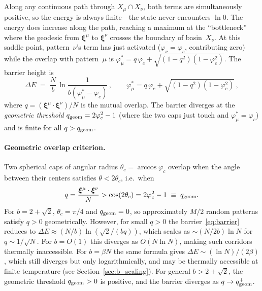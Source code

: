 \documentclass[11pt]{article}
\newcommand{\vp}{\varphi}
\newcommand{\bxi}{\boldsymbol{\xi}}
\begin{document}
Along any continuous path through $X_\mu \cap X_\nu$,
both terms are simultaneously positive, so the energy
is always finite---the state never encounters $\ln 0$.
The energy does increase along the path, reaching a maximum
at the ``bottleneck'' where the geodesic from $\bxi^\mu$ to
$\bxi^\nu$ crosses the boundary of basin~$X_\nu$.
At this saddle point, pattern~$\nu$'s term has just activated
($\vp_\nu = \vp_c$, contributing zero) while the overlap
with pattern~$\mu$ is
$\vp_\mu^* = q\,\vp_c + \sqrt{(1-q^2)(1-\vp_c^2)}$.
The barrier height is
\begin{equation}\label{eq:barrier}
  \Delta E \;=\; \frac{N}{b}\,\ln\frac{1}{b(\vp_\mu^* - \vp_c)}\,,
  \qquad
  \vp_\mu^* = q\,\vp_c + \sqrt{(1-q^2)(1-\vp_c^2)}\,,
\end{equation}
where $q = (\bxi^\mu \cdot \bxi^\nu)/N$ is the mutual overlap.
The barrier diverges at the \emph{geometric threshold}
$q_{\rm geom} = 2\vp_c^2 - 1$
(where the two caps just touch and $\vp_\mu^* = \vp_c$)
and is finite for all $q > q_{\rm geom}$.

\paragraph{Geometric overlap criterion.}
Two spherical caps of angular radius $\theta_c = \arccos\vp_c$
overlap when the angle between their centers satisfies
$\theta < 2\theta_c$, i.e.\ when
\begin{equation}\label{eq:geom_overlap}
  q = \frac{\bxi^\mu \cdot \bxi^\nu}{N}
  > \cos(2\theta_c) = 2\vp_c^2 - 1
  \;\equiv\; q_{\rm geom}.
\end{equation}
For $b = 2 + \sqrt{2}$, $\theta_c = \pi/4$ and
$q_{\rm geom} = 0$, so approximately $M/2$ random patterns
satisfy $q > 0$ geometrically.
However, for small $q > 0$ the
barrier~\eqref{eq:barrier} reduces to
$\Delta E \approx (N/b)\ln(\sqrt{2}/(bq))$, which scales as
$\sim (N/2b)\ln N$ for $q \sim 1/\sqrt{N}$.
For $b = O(1)$ this diverges as $O(N\ln N)$, making such
corridors thermally inaccessible.
For $b = \beta N$ the same formula gives $\Delta E \sim (\ln N)/(2\beta)$,
which still diverges but only logarithmically, and may be
thermally accessible at finite temperature
(see Section~\ref{sec:b_scaling}).
For general $b > 2 + \sqrt{2}$, the geometric threshold
$q_{\rm geom} > 0$ is positive, and the barrier diverges
as $q \to q_{\rm geom}^+$.
\end{document}
